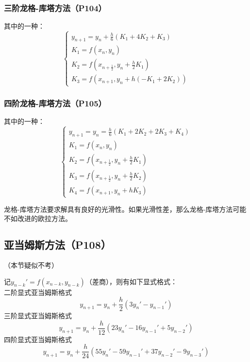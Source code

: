 \documentclass[fontset=ubuntu]{ctexart}
\numberwithin{equation}{section}
\numberwithin{theorem}{section}
\begin{document}
\begin{multicols}{2}
    \subsubsection{三阶龙格-库塔方法（P104）}

    其中的一种：
    \begin{equation}
        \left\{\begin{array}{l}
            y_{n+1} = y_n+\frac{h}{6}(K_1+4K_2+K_3) \\
            K_1 = f(x_n,y_n) \\
            K_2 = f\left(x_{n+\frac{1}{2}},y_n+\frac{h}{2}K_1 \right ) \\
            K_3 = f\left(x_{n+1},y_n+h(-K_1+2K_2) \right )
        \end{array}\right.
    \end{equation}

    \subsubsection{四阶龙格-库塔方法（P105）}

    其中的一种：
    \begin{equation}
        \left\{\begin{array}{l}
            y_{n+1} = y_n=\frac{h}{6}(K_1+2K_2+2K_3+K_4) \\
            K_1 = f(x_n,y_n) \\
            K_2 = f\left(x_{n+\frac{1}{2}},y_n+\frac{h}{2}K_1 \right ) \\
            K_3 = f\left(x_{n+\frac{1}{2}},y_n+\frac{h}{2}K_2 \right ) \\
            K_4=f\left(x_{n+1},y_n+hK_3\right)
        \end{array}\right.
    \end{equation}
    
    龙格-库塔方法要求解具有良好的光滑性。如果光滑性差，那么龙格-库塔方法可能不如改进的欧拉方法。

    \subsection{亚当姆斯方法（P108）}

    （本节疑似不考）

    记$y_{n-k}'=f(x_{n-k},y_{n-k})$（差商），则有如下显式格式：\\
    二阶显式亚当姆斯格式
    \begin{equation}
        y_{n+1}=y_n+\frac{h}{2}(3y_n'-y_{n-1}')
    \end{equation}
    三阶显式亚当姆斯格式
    \begin{equation}
        y_{n+1}=y_n+\frac{h}{12}(23y_n'-16y_{n-1}'+5y_{n-2}')
    \end{equation}
    四阶显式亚当姆斯格式
    \begin{equation}
        y_{n+1}=y_n+\frac{h}{24}(55y_n'-59y_{n-1}'+37y_{n-2}'-9y_{n-3}')
    \end{equation}


\end{multicols}
\end{document}
